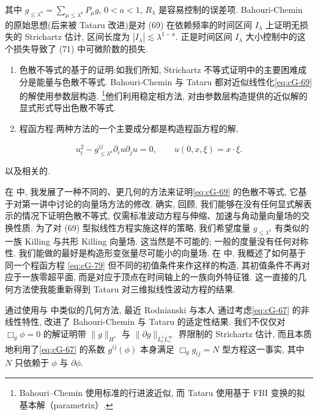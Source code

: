 其中 $g_{\leq \lambda^a} = \sum_{\mu \leq \lambda^a} P_\mu g$, $0 < a < 1$, $R_\lambda$ 是容易控制的误差项. Bahouri-Chemin 的原始思想(后来被 Tataru 改进)是对 (69) 在依赖频率的时间区间 $I_{\lambda}$ 上证明无损失的 Strichartz 估计, 区间长度为 $|I_{\lambda}| \lesssim \lambda^{1-a}$. 正是时间区间 $I_{\lambda}$ 大小控制中的这个损失导致了 (71) 中可微阶数的损失. 

\begin{enumerate}
\def\labelenumi{\alph{enumi})}
\setcounter{enumi}{1}
\item 色散不等式的基于的证明:如我们所知, Strichartz 不等式证明中的主要困难成分是能量与色散不等式. Bahouri-Chemin 与 Tataru 都对近似线性化\eqref{eq:cG-69} 的解使用参数层构造. \footnote{Bahouri--Chemin 使用标准的行进波近似, 而 Tataru 使用基于 FBI 变换的拟基本解（parametrix）.}他们利用稳定相方法, 对由参数层构造提供的近似解的显式形式导出色散不等式. 
\item 程函方程:两种方法的一个主要成分都是构造程函方程的解, 
\end{enumerate}

\begin{equation}
u _ {t} ^ {2} - g _ {\leq \lambda^ {a}} ^ {i j} \partial_ {i} u \partial_ {j} u = 0,  \qquad u (0,  x,  \xi) = x \cdot \xi .\label{eq:cG-70}
\end{equation}

以及相关的. 

在 \cite{gfref30} 中, 我发展了一种不同的、更几何的方法来证明\eqref{eq:cG-69} 的色散不等式, 它基于对第一讲中讨论的向量场方法的修改. 确实, 回顾, 我们能够在没有任何显式解表示的情况下证明色散不等式, 仅需标准波动方程与伸缩、加速与角动量向量场的交换性质. 为了对 (69) 型拟线性方程实施这样的策略, 我们希望度量 $g_{\leq\lambda^{a}}$ 有类似的一族 Killing 与共形 Killing 向量场. 这当然是不可能的; 一般的度量没有任何对称性. 我们能做的最好是构造形变张量尽可能小的向量场. 在 \cite{gfref30} 中, 我概述了如何基于同一个程函方程 \eqref{eq:cG-79} 但不同的初值条件来作这样的构造, 其初值条件不再对应于一族零超平面, 而是对应于顶点在时间轴上的一族向外特征锥. 这一直接的几何方法使我能重新得到 Tataru 对三维拟线性波动方程的结果. 

通过使用与 \cite{gfref30} 中类似的几何方法, 最近 Rodnianski 与本人 \cite{gfref42} 通过考虑\eqref{eq:cG-67} 的非线性特性, 改进了 Bahouri-Chemin 与 Tataru 的适定性结果. 我们不仅仅对 $\Box_g\phi = 0$ 的解证明带 $\| g\|_{H^s}$ 与 $\| \partial g\|_{L_t^1 L_x^\infty}$ 界限制的 Strichartz 估计, 而且本质地利用了\eqref{eq:cG-67} 的系数 $g^{ij}(\phi)$ 本身满足 $\Box_gg_{ij} = N$ 型方程这一事实, 其中 $N$ 只依赖于 $\phi$ 与 $\partial \phi$. 

